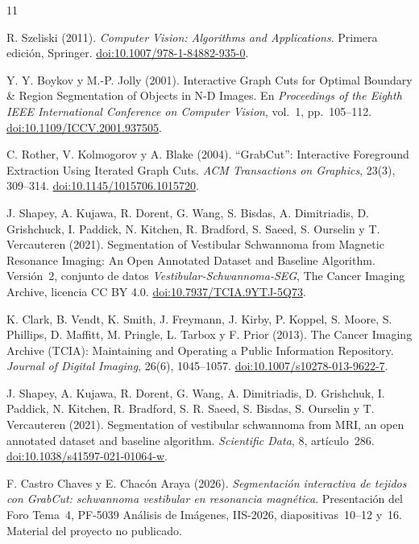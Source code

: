 \begin{thebibliography}{11}
\small

R. Szeliski (2011).
\textit{Computer Vision: Algorithms and Applications}.
Primera edición, Springer.
\href{https://doi.org/10.1007/978-1-84882-935-0}{doi:10.1007/978-1-84882-935-0}.

Y. Y. Boykov y M.-P. Jolly (2001).
Interactive Graph Cuts for Optimal Boundary \& Region Segmentation
of Objects in N-D Images.
En \textit{Proceedings of the Eighth IEEE International Conference on Computer Vision}, vol.~1, pp.~105--112.
\href{https://doi.org/10.1109/ICCV.2001.937505}{doi:10.1109/ICCV.2001.937505}.

C. Rother, V. Kolmogorov y A. Blake (2004).
``GrabCut'': Interactive Foreground Extraction Using Iterated Graph Cuts. \textit{ACM Transactions on Graphics}, 23(3), 309--314.
\href{https://doi.org/10.1145/1015706.1015720}{doi:10.1145/1015706.1015720}.

J. Shapey, A. Kujawa, R. Dorent, G. Wang, S. Bisdas, A. Dimitriadis,
D. Grishchuck, I. Paddick, N. Kitchen, R. Bradford, S. Saeed, S. Ourselin
y T. Vercauteren (2021).
Segmentation of Vestibular Schwannoma from Magnetic Resonance Imaging:
An Open Annotated Dataset and Baseline Algorithm.
Versión~2, conjunto de datos \textit{Vestibular-Schwannoma-SEG},
The Cancer Imaging Archive, licencia CC BY 4.0.
\href{https://doi.org/10.7937/TCIA.9YTJ-5Q73}{doi:10.7937/TCIA.9YTJ-5Q73}.

K. Clark, B. Vendt, K. Smith, J. Freymann, J. Kirby, P. Koppel, S. Moore,
S. Phillips, D. Maffitt, M. Pringle, L. Tarbox y F. Prior (2013).
The Cancer Imaging Archive (TCIA): Maintaining and Operating a Public
Information Repository.
\textit{Journal of Digital Imaging}, 26(6), 1045--1057.
\href{https://doi.org/10.1007/s10278-013-9622-7}{doi:10.1007/s10278-013-9622-7}.

J. Shapey, A. Kujawa, R. Dorent, G. Wang, A. Dimitriadis, D. Grishchuk,
I. Paddick, N. Kitchen, R. Bradford, S. R. Saeed, S. Bisdas, S. Ourselin
y T. Vercauteren (2021).
Segmentation of vestibular schwannoma from MRI, an open annotated
dataset and baseline algorithm.
\textit{Scientific Data}, 8, artículo~286.
\href{https://doi.org/10.1038/s41597-021-01064-w}{doi:10.1038/s41597-021-01064-w}.

F. Castro Chaves y E. Chacón Araya (2026).
\textit{Segmentación interactiva de tejidos con GrabCut: schwannoma
vestibular en resonancia magnética}.
Presentación del Foro Tema~4, PF-5039 Análisis de Imágenes, IIS-2026,
diapositivas~10--12 y~16. Material del proyecto no publicado.


\end{thebibliography}
